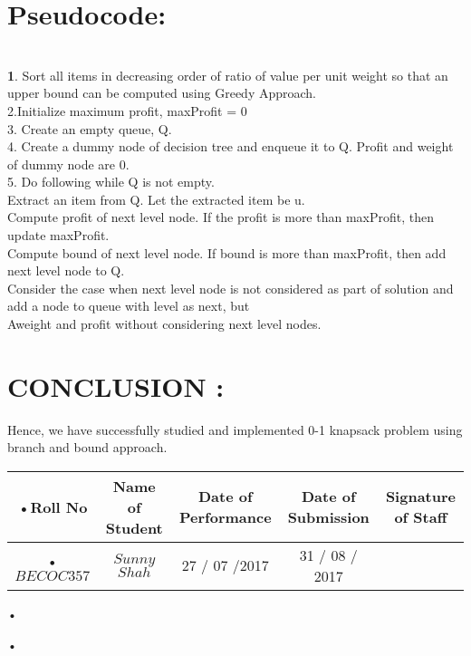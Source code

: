 \documentclass{article}
\begin{document}
	\section{ Pseudocode: }\\
	\textbf
	1. Sort all items in decreasing order of ratio of value per unit weight so that an upper bound can be computed using Greedy Approach.\\
	2.Initialize maximum profit, maxProfit = 0\\
	3. Create an empty queue, Q.\\
	4. Create a dummy node of decision tree and enqueue it to Q. Profit and weight of dummy node are 0.\\
	5. Do following while Q is not empty.\\
	Extract an item from Q. Let the extracted item be u.\\
	Compute profit of next level node. If the profit is more than maxProfit, then update maxProfit.\\
	Compute bound of next level node. If bound is more than maxProfit, then add next level node to Q.\\
	Consider the case when next level node is not considered as part of solution and add a node to queue with level as next, but\\ 	   Aweight and profit without considering next level nodes.\\
	
	\section{CONCLUSION : }
	
	Hence, we have successfully studied and implemented  0-1 knapsack problem using branch and bound approach.
	
	\begin{center}
		\begin{tabular}{|c|c|c|c|c|}
			\hline	
			•Roll No &  Name of Student & Date of Performance & Date of Submission&Signature of Staff\\ \hline
			•$BECOC357$    & $Sunny  $ $Shah$& 27 / 07 /2017 & 31 / 08 / 2017 \\ \hline
		\end{tabular}•
	\end{center}•
	
	
	
\end{document}
